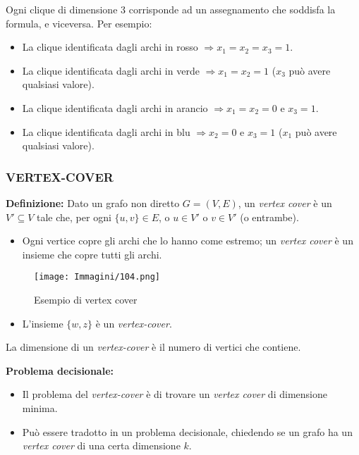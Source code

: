 \documentclass{article}
\begin{document}
Ogni clique di dimensione 3 corrisponde ad un assegnamento che soddisfa la formula, e viceversa. Per esempio:
\begin{itemize}
    \item La clique identificata dagli archi in rosso $\Rightarrow x_1 = x_2 = x_3 = 1$.
    \item La clique identificata dagli archi in verde $\Rightarrow x_1 = x_2 = 1$ ($x_3$ può avere qualsiasi valore).
    \item La clique identificata dagli archi in arancio $\Rightarrow x_1 = x_2 = 0$ e $x_3 = 1$.
    \item La clique identificata dagli archi in blu $\Rightarrow x_2 = 0$ e $x_3 = 1$ ($x_1$ può avere qualsiasi valore).
\end{itemize}

\subsubsection{VERTEX-COVER}
\textbf{Definizione:} Dato un grafo non diretto $G = (V, E)$, un \textit{vertex cover} è un $V' \subseteq V$ tale che, per ogni $\{u,v\} \in E$, o $u \in V'$ o $v \in V'$ (o entrambe).

\begin{itemize}
    \item Ogni vertice copre gli archi che lo hanno come estremo; un \textit{vertex cover} è un insieme che copre tutti gli archi.
\end{itemize}

\begin{figure}[H]
    \centering
    \texttt{[image: Immagini/104.png]}
    \caption{Esempio di vertex cover}
    \label{fig:vertex-cover-example}
\end{figure}
\begin{itemize}
    \item L’insieme $\{w, z\}$ è un \textit{vertex-cover}.
\end{itemize}
La dimensione di un \textit{vertex-cover} è il numero di vertici che contiene. 

\textbf{Problema decisionale:}
\begin{itemize}
    \item Il problema del \textit{vertex-cover} è di trovare un \textit{vertex cover} di dimensione minima.
    \item Può essere tradotto in un problema decisionale, chiedendo se un grafo ha un \textit{vertex cover} di una certa dimensione $k$.
\end{itemize}
\end{document}
